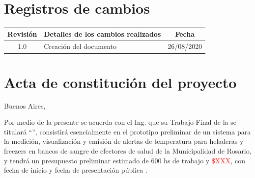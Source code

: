 \documentclass[11pt]{charter}
\begin{document}
\maketitle
\thispagestyle{empty}
\pagebreak


\thispagestyle{empty}
{\setlength{\parskip}{0pt}
\tableofcontents{}
}
\pagebreak


\section{Registros de cambios}
\label{sec:registro}


\begin{table}[ht]
\label{tab:registro}
\centering
\begin{tabularx}{\linewidth}{@{}|c|X|c|@{}}
\hline
\rowcolor[HTML]{C0C0C0} 
Revisión & \multicolumn{1}{c|}{\cellcolor[HTML]{C0C0C0}Detalles de los cambios realizados} & Fecha      \\ \hline
1.0      & Creación del documento                                          & 26/08/2020 \\ \hline
\end{tabularx}
\end{table}

\pagebreak



\section{Acta de constitución del proyecto}
\label{sec:acta}

\begin{flushright}
Buenos Aires, \fechaInicioName
\end{flushright}

\vspace{2cm}

Por medio de la presente se acuerda con el Ing. \authorname\hspace{1px} que su Trabajo Final de la \degreename\hspace{1px} se titulará ``\ttitle'', consistirá esencialmente en el prototipo preliminar de un sistema para la medición, visualización y emisión de alertas de temperatura para heladeras y freezers en bancos de sangre de efectores de salud de la Municipalidad de Rosario, y tendrá un presupuesto preliminar estimado de 600 hs de trabajo y \textcolor{red}{\$XXX}, con fecha de inicio \fechaInicioName\hspace{1px} y fecha de presentación pública \fechaFinalName.
\end{document}
